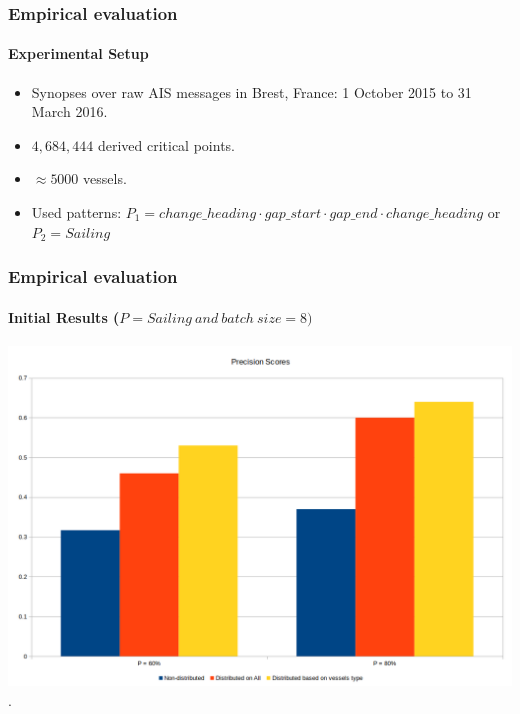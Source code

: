 \begin{frame}
	
	\frametitle{Empirical evaluation }
	\framesubtitle{Experimental Setup}
\begin{itemize}
	\item<1-> Synopses over raw AIS messages in Brest, France: 1 October 2015 to 31 March 2016. 
	
	\item<1->$ 4,684,444$ derived critical points.
	
	\item<1->  $\approx5000$ vessels.
	\item<only@1> Used patterns: 
	$P_1=\mathit{change\_heading} \cdot \mathit{gap\_start} \cdot \mathit{gap\_end} \cdot 
	\mathit{change\_heading}$ or $\mathit{P_2=Sailing}$
\end{itemize}
	
\end{frame}


\begin{frame}
	
	\frametitle{Empirical evaluation }
	\framesubtitle{Initial  Results ($\mathit{P=Sailing}\ and\ batch\ size= 8)$}
	
	\begin{center}
		\includegraphics[width=1.05\textwidth,left]{figures/presention/precision_1.png}\\
		.
	\end{center}
	
\end{frame}


